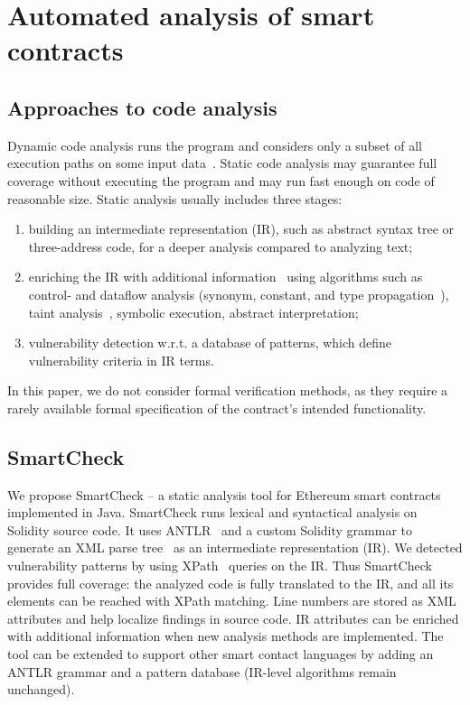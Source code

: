 \section{Automated analysis of smart contracts}

\subsection{Approaches to code analysis}

Dynamic code analysis runs the program and considers only a subset of all execution paths on some input data~\cite{Liu2012}.
Static code analysis may guarantee full coverage without executing the program and may run fast enough on code of reasonable size.
Static analysis usually includes three stages:
\begin{enumerate}
	\item building an intermediate representation (IR), such as abstract syntax tree or three-address code, for a deeper analysis compared to analyzing text;
	\item enriching the IR with additional information~\cite{Woegerer2005} using algorithms such as control- and dataflow analysis (synonym, constant, and type propagation~\cite{Aho1986}), taint analysis~\cite{Tripp2009}, symbolic execution, abstract interpretation;
	\item vulnerability detection w.r.t. a database of patterns, which define vulnerability criteria in IR terms.
\end{enumerate}
In this paper, we do not consider formal verification methods, as they require a rarely available formal specification of the contract's intended functionality.

	
\subsection{SmartCheck}

We propose SmartCheck -- a static analysis tool for Ethereum smart contracts implemented in Java.
SmartCheck runs lexical and syntactical analysis on Solidity source code.
It uses ANTLR~\cite{Parr} and a custom Solidity grammar to generate an XML parse tree~\cite{Aho1986} as an intermediate representation (IR).
We detected vulnerability patterns by using XPath~\cite{Liu2009} queries on the IR.
Thus SmartCheck provides full coverage: the analyzed code is fully translated to the IR, and all its elements can be reached with XPath matching.
Line numbers are stored as XML attributes and help localize findings in source code.
IR attributes can be enriched with additional information when new analysis methods are implemented.
The tool can be extended to support other smart contact languages by adding an ANTLR grammar and a pattern database (IR-level algorithms remain unchanged).

